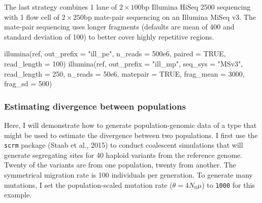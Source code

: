 \documentclass[12pt,]{article}
\newenvironment{Shaded}{}{}
\newcommand{\DataTypeTok}[1]{#1}
\newcommand{\DecValTok}[1]{#1}
\newcommand{\FloatTok}[1]{#1}
\newcommand{\KeywordTok}[1]{\textcolor[rgb]{0.00,0.00,1.00}{#1}}
\newcommand{\NormalTok}[1]{#1}
\newcommand{\OperatorTok}[1]{#1}
\newcommand{\OtherTok}[1]{\textcolor[rgb]{1.00,0.25,0.00}{#1}}
\newcommand{\StringTok}[1]{\textcolor[rgb]{0.00,0.50,0.50}{#1}}
\begin{document}
The last strategy combines 1 lane of \(2 \times 100\)bp Illumina HiSeq 2500 sequencing
with 1 flow cell of \(2 \times 250\)bp mate-pair sequencing on an Illumina MiSeq v3.
The mate-pair sequencing uses longer fragments (defaults are mean of 400 and
standard deviation of 100) to better cover highly
repetitive regions.

\begin{Shaded}
\begin{Highlighting}[]
\KeywordTok{illumina}\NormalTok{(ref, }\DataTypeTok{out_prefix =} \StringTok{"ill_pe"}\NormalTok{, }\DataTypeTok{n_reads =} \FloatTok{500e6}\NormalTok{, }\DataTypeTok{paired =} \OtherTok{TRUE}\NormalTok{,}
         \DataTypeTok{read_length =} \DecValTok{100}\NormalTok{)}
\KeywordTok{illumina}\NormalTok{(ref, }\DataTypeTok{out_prefix =} \StringTok{"ill_mp"}\NormalTok{, }\DataTypeTok{seq_sys =} \StringTok{"MSv3"}\NormalTok{,}
         \DataTypeTok{read_length =} \DecValTok{250}\NormalTok{, }\DataTypeTok{n_reads =} \FloatTok{50e6}\NormalTok{, }\DataTypeTok{matepair =} \OtherTok{TRUE}\NormalTok{, }
         \DataTypeTok{frag_mean =} \DecValTok{3000}\NormalTok{, }\DataTypeTok{frag_sd =} \DecValTok{500}\NormalTok{)}
\end{Highlighting}
\end{Shaded}

\hypertarget{estimating-divergence-between-populations}{%
\subsubsection{Estimating divergence between populations}\label{estimating-divergence-between-populations}}

Here, I will demonstrate how to generate population-genomic data of a type that might
be used to estimate the divergence between two populations.
I first use the \texttt{scrm} package (Staab et al., 2015)
to conduct
coalescent simulations that will generate segregating sites for 40 haploid variants
from the reference genome.
Twenty of the variants are from one population, twenty from another.
The symmetrical migration rate is 100 individuals per generation.
To generate many mutations, I set the population-scaled mutation rate
(\(\theta = 4 N_0 \mu\)) to \texttt{1000} for this example.

\begin{Shaded}
\end{Shaded}
\end{document}
